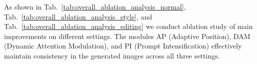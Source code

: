 
As shown in Tab.~\ref{tab:overall_ablation_analysis_normal}, Tab.~\ref{tab:overall_ablation_analysis_style}, and Tab.~\ref{tab:overall_ablation_analysis_editing} we conduct ablation study of main improvements on different settings. The modules AP (Adaptive Position), DAM (Dynamic Attention Modulation), and PI (Prompt Intensification) effectively maintain consistency in the generated images across all three settings.

